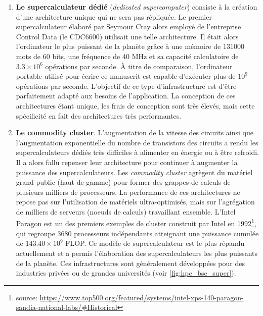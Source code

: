    \begin{enumerate}
        \item \textbf{Le supercalculateur dédié} (\textit{dedicated supercomputer}) consiste à la création d'une architecture unique qui ne sera pas répliquée.  Le premier supercalculateur élaboré par Seymour Cray alors employé de l'entreprise Control Data (le CDC6600) utilisait une telle architecture. Il était alors l'ordinateur le plus puissant de la planète grâce à une mémoire de 131000 mots de 60 bits, une fréquence de 40 MHz et sa capacité calculatoire de $3.3 \times 10^6$ opérations par seconde. À titre de comparaison, l'ordinateur portable utilisé pour écrire ce manuscrit est capable d'exécuter plus de $10^9$ opérations par seconde. L'objectif de ce type d'infrastructure est d'être parfaitement adapté aux besoins de l'application. La conception de ces architectures étant unique, les frais de conception sont très élevés, mais cette spécificité en fait des architectures très performantes. 
        
        \item \textbf{Le commodity cluster}. L'augmentation de la vitesse des circuits ainsi que l'augmentation exponentielle du nombre de transistors des circuits a rendu les supercalculateurs dédiés très difficiles à alimenter en énergie ou à être refroidi. Il a alors fallu repenser leur architecture pour continuer à augmenter la puissance des supercalculateurs. Les \textit{commodity cluster} agrègent du matériel grand public (haut de gamme) pour former des grappes de calculs de plusieurs milliers de processeurs. La performance de ces architectures ne repose pas sur l'utilisation de matériels ultra-optimisés, mais sur l'agrégation de milliers de serveurs (noeuds de calculs) travaillant ensemble. L'Intel Paragon est un des premiers exemples de cluster construit par Intel en 1992\footnote{source: \url{https://www.top500.org/featured/systems/intel-xps-140-paragon-sandia-national-labs/\#Historical}}, qui regroupe 3680 processeurs indépendants atteignant une puissance cumulée de $143.40 \times 10^9$ \gls{FLOP}. Ce modèle de supercalculateur est le plus répandu actuellement et a permis l'élaboration des supercalculateurs les plus puissants de la planète. Ces infrastructures sont généralement développées pour des industries privées ou de grandes universités (voir \autoref{fig:hpc_bsc_super}).
        

\end{enumerate}

